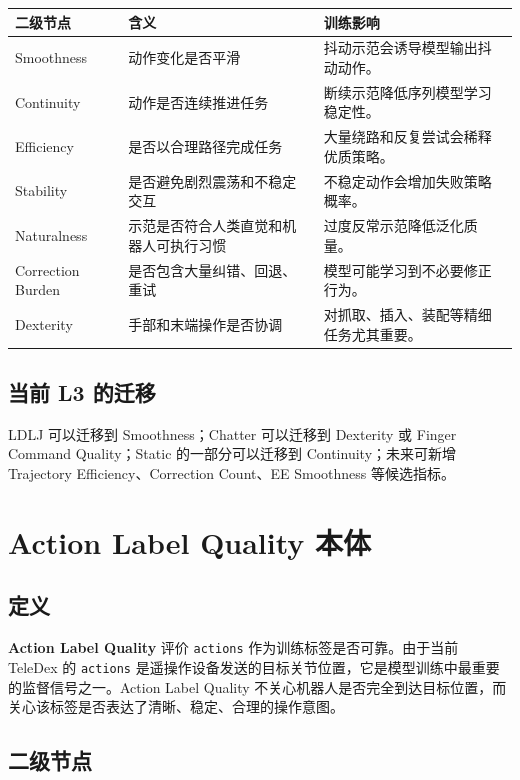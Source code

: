 \documentclass[UTF8,zihao=-4,oneside,openany]{ctexrep}
\newcommand{\Code}[1]{\texttt{#1}}
\newcommand{\Term}[1]{\textbf{#1}}
\begin{document}
\begin{longtable}{L{3.1cm} L{4.7cm} L{5.8cm}}
\toprule
二级节点 & 含义 & 训练影响 \\
\midrule
Smoothness & 动作变化是否平滑 & 抖动示范会诱导模型输出抖动动作。 \\
Continuity & 动作是否连续推进任务 & 断续示范降低序列模型学习稳定性。 \\
Efficiency & 是否以合理路径完成任务 & 大量绕路和反复尝试会稀释优质策略。 \\
Stability & 是否避免剧烈震荡和不稳定交互 & 不稳定动作会增加失败策略概率。 \\
Naturalness & 示范是否符合人类直觉和机器人可执行习惯 & 过度反常示范降低泛化质量。 \\
Correction Burden & 是否包含大量纠错、回退、重试 & 模型可能学习到不必要修正行为。 \\
Dexterity & 手部和末端操作是否协调 & 对抓取、插入、装配等精细任务尤其重要。 \\
\bottomrule
\end{longtable}

\subsection{当前 L3 的迁移}

LDLJ 可以迁移到 Smoothness；Chatter 可以迁移到 Dexterity 或 Finger Command Quality；Static 的一部分可以迁移到 Continuity；未来可新增 Trajectory Efficiency、Correction Count、EE Smoothness 等候选指标。

\section{Action Label Quality 本体}

\subsection{定义}

\Term{Action Label Quality} 评价 \Code{actions} 作为训练标签是否可靠。由于当前 TeleDex 的 \Code{actions} 是遥操作设备发送的目标关节位置，它是模型训练中最重要的监督信号之一。Action Label Quality 不关心机器人是否完全到达目标位置，而关心该标签是否表达了清晰、稳定、合理的操作意图。

\subsection{二级节点}
\end{document}
